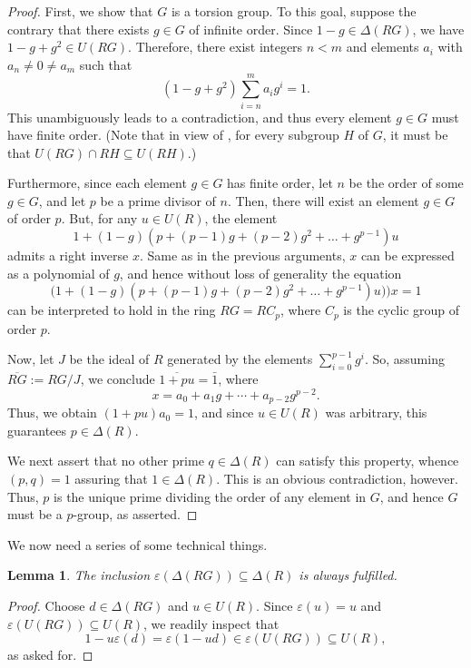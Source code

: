 \documentclass[12pt]{amsart}
\newtheorem{lemma}[theorem]{Lemma}
\theoremstyle{definition}
\begin{document}
\begin{proof}
First, we show that $G$ is a torsion group. To this goal, suppose the contrary that there exists $g \in G$ of infinite order. Since $1-g \in \Delta(RG)$, we have $1-g+g^2 \in U(RG)$. Therefore, there exist integers $n < m$ and elements $a_i$ with $a_n \neq 0 \neq a_m$ such that
\[
(1-g+g^2)\sum_{i=n}^{m} a_ig^i = 1.
\]
This unambiguously leads to a contradiction, and thus every element $g \in G$ must have finite order. (Note that in view of \cite[Proposition 4(i)]{coon}, for every subgroup $H$ of $G$, it must be that $U(RG) \cap RH \subseteq U(RH)$.)

Furthermore, since each element \( g \in G \) has finite order, let \( n \) be the order of some \( g \in G \), and let \( p \) be a prime divisor of \( n \). Then, there will exist an element \( g \in G \) of order \( p \). But, for any \( u \in U(R) \), the element
\[ 1 + (1 - g)(p + (p-1)g + (p-2)g^2 + \dots + g^{p-1})u \]
admits a right inverse \( x \). Same as in the previous arguments, \( x \) can be expressed as a polynomial of \( g \), and hence without loss of generality the equation
\[ \big(1 + (1 - g)(p + (p-1)g + (p-2)g^2 + \dots + g^{p-1})u)\big)x=1 \]
can be interpreted to hold in the ring \( RG = RC_p \), where \( C_p \) is the cyclic group of order \( p \).

Now, let \( J \) be the ideal of \( R \) generated by the elements \( \sum_{i=0}^{p-1}g^{i} \). So, assuming $\overline{RG} := RG/J$, we conclude $\overline{1+pu} = \bar{1}$, where
\[ x = a_0 + a_1g + \cdots + a_{p-2}g^{p-2}. \]
Thus, we obtain $(1+pu)a_0 = 1$, and since \( u \in U(R) \) was arbitrary, this guarantees $p \in \Delta(R)$.

We next assert that no other prime \( q \in \Delta(R) \) can satisfy this property, whence $(p,q)=1$ assuring that $1 \in \Delta(R)$. This is an obvious contradiction, however. Thus, \( p \) is the unique prime dividing the order of any element in \( G \), and hence \( G \) must be a \( p \)-group, as asserted.
\end{proof}

We now need a series of some technical things.

\begin{lemma}\label{1}
The inclusion $\varepsilon(\Delta(RG)) \subseteq \Delta(R)$ is always fulfilled.
\end{lemma}

\begin{proof}
Choose $d \in \Delta(RG)$ and $u \in U(R)$. Since $\varepsilon(u)=u$ and $\varepsilon(U(RG)) \subseteq U(R)$, we readily inspect that
\[
1 - u\varepsilon(d) = \varepsilon(1 - ud) \in \varepsilon(U(RG)) \subseteq U(R),
\]
as asked for.
\end{proof}
\end{document}
